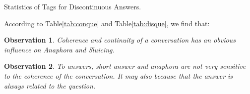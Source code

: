 \documentclass[bsc,frontabs,twoside,singlespacing,parskip,deptreport]{infthesis}     %
\newtheorem{observation}{Observation}[chapter]
\begin{document}
\begin{minipage}{\textwidth}
\begin{minipage}[t]{0.45\textwidth}
        \end{minipage}
        \begin{minipage}[t]{0.45\textwidth}
        \centering
        \makeatletter{}\makeatother
{}
\caption{Statistics of Tags for Discontinuous Answers.}
\label{tab:disans}

        \end{minipage}
    \end{minipage}


According to Table\ref{tab:conque} and Table\ref{tab:disque}, we find that:

\begin{observation}
Coherence and continuity of a conversation has an obvious influence on Anaphora and Sluicing.
\end{observation}

\begin{observation}
To answers, short answer and anaphora are not very sensitive to the coherence of the conversation. It may also because that the answer is always related to the question. 
\end{observation}
\end{document}
